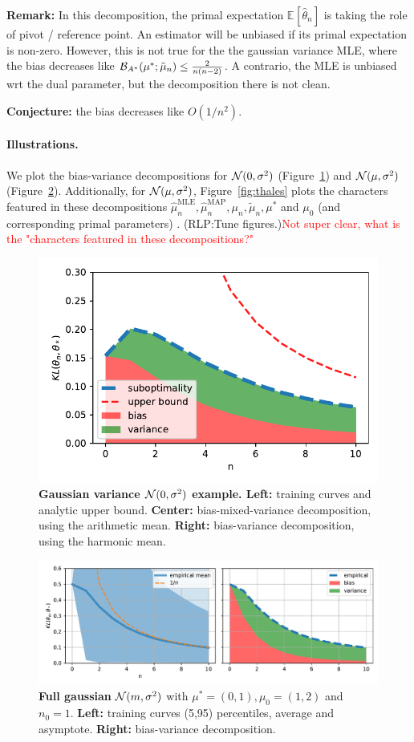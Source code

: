 \documentclass[twoside]{article}
\newcommand{\rlp}[1]{\textcolor{BrickRed}{(RLP:#1)}}
\newcommand*{\expect}[2][]{\ensuremath{\mathbb{E}_{#1} \left[ #2 \right] }} %
\newcommand{\logpart}{A}
\newcommand{\bregmanconj}{\cB_{\logpart^*}}
\newcommand{\m}{\mu}
\newcommand{\meanp}{\m}
\begin{document}
\textbf{Remark:} In this decomposition, the primal expectation $\expect{\hat \theta_n}$ is taking the role of pivot / reference point. An estimator will be unbiased if its primal expectation is non-zero.
However, this is not true for the the gaussian variance MLE, where the bias decreases like ${\bregmanconj(\m^* ; \tilde \m_n)} \leq \frac{2}{n(n-2)}$.
A contrario, the MLE is unbiased wrt the dual parameter, but the decomposition there is not clean.

\textbf{Conjecture:} the bias decreases like $O(1/n^2)$.

\paragraph{Illustrations.}
We plot the bias-variance decompositions for ${\mathcal N}(0,\sigma^2)$ (Figure~\ref{fig:variance_decomposition}) and  ${\mathcal N}(\mu, \sigma^2)$ (Figure~\ref{fig:gaussian_decomposition}).
Additionally,  for ${\mathcal N}(\mu, \sigma^2)$, Figure~\ref{fig:thales} plots the characters featured in these decompositions $\hat \m_n^\text{MLE},\hat \m_n^\text{MAP},\m_n,\tilde \m_n, \m^*$ and $\m_0$ (and corresponding primal parameters) . \rlp{Tune figures.}\textcolor{red}{Not super clear, what is the "characters featured in these decompositions?"}


\begin{figure}[t]
	\centering
	\includegraphics[width=.4\textwidth]{figs/gaussian_variance.pdf}
	\caption{
	\textbf{Gaussian variance ${\mathcal N}(0,\sigma^2)$ example. Left:} training curves and analytic upper bound.
	\textbf{Center:} bias-mixed-variance decomposition, using the arithmetic mean.
	\textbf{Right:} bias-variance decomposition, using the harmonic mean.
	}
	\label{fig:variance_decomposition}
\end{figure}

\begin{figure}[t]
	\centering
	\includegraphics[width=.4\textwidth]{figs/gaussians/new_linear_n0=1.pdf}
	\caption{
	\textbf{Full gaussian} ${\mathcal N}(m, \sigma^2)$ with $\meanp^*=(0, 1), \meanp_0 = (1,2)$ and $n_0=1$. \textbf{Left:} training curves (5,95) percentiles, average and asymptote.
	\textbf{Right:} bias-variance decomposition.
	}
	\label{fig:gaussian_decomposition}
\end{figure}
\end{document}
